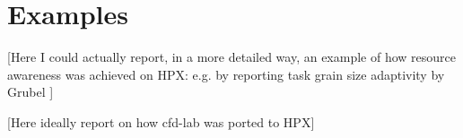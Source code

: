 
\section{Examples} \label{sec:examples}
[\TODO Here I could actually report, in a more detailed way, an example of how resource awareness was achieved on HPX: e.g. by reporting task grain size adaptivity by Grubel \cite{grubel2016dynamic}]

[\TODO Here ideally report on how cfd-lab was ported to HPX]


